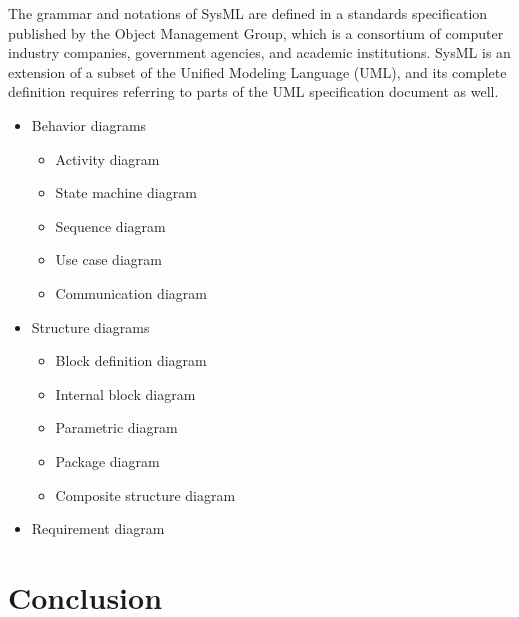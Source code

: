 The grammar and notations of SysML are defined in a standards specification published by the Object Management Group, which is a consortium of computer industry companies, government agencies, and academic institutions. SysML is an extension of a subset of the Unified Modeling Language (UML), and its complete definition requires referring to parts of the UML specification document as well.\cite{LD13}
\begin{itemize}
\item Behavior diagrams\cite{LD13}
\begin{itemize}
\item Activity diagram
\item State machine diagram
\item Sequence diagram
\item Use case diagram
\item Communication diagram
\end{itemize}
\item Structure diagrams\cite{LD13}
\begin{itemize}
\item Block definition diagram
\item Internal block diagram
\item Parametric diagram
\item Package diagram
\item Composite structure diagram
\end{itemize}
\item Requirement diagram\cite{LD13}
\end{itemize}
\vspace{1em}


\section*{Conclusion}





%